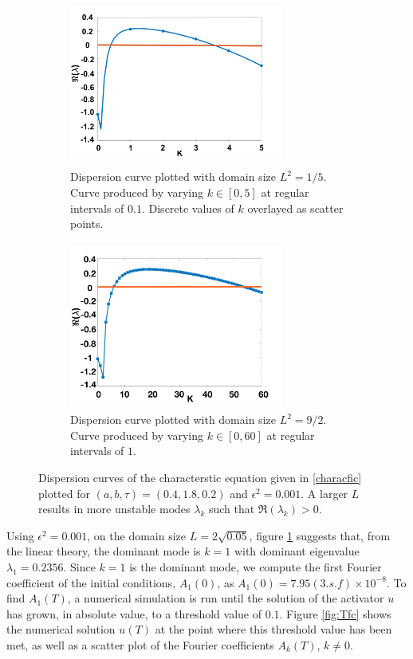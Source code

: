 \begin{figure}[H]
    \centering
    \begin{subfigure}[b]{0.45\textwidth}
        \centering
        \includegraphics[width=7cm,height=5.5cm]{compdisp1.png}
        \caption{Dispersion curve plotted with domain size $L^2=1/5$. Curve produced by varying $k\in[0,5]$ at regular intervals of $0.1$. Discrete values of $k$ overlayed as scatter points. }
        \label{fig:compdisp1}
    \end{subfigure}
    \hfill
    \begin{subfigure}[b]{0.45\textwidth}
        \centering
        \includegraphics[width=7cm,height=5.5cm]{compdisp2.png}
        \caption{Dispersion curve plotted with domain size $L^2=9/2$. Curve produced by varying $k\in[0,60]$ at regular intervals of $1$.}
        \label{fig:compdisp2}
    \end{subfigure}
    \caption{Dispersion curves of the characterstic equation given in \eqref{characfic} plotted for $(a,b,\tau)=(0.4,1.8,0.2)$ and $\epsilon^2=0.001$. A larger $L$ results in more unstable modes $\lambda_k$ such that $\Re(\lambda_k)>0$. }
    \label{fig:compardisp}
\end{figure}
Using $\epsilon^2=0.001$, on the domain size $L=2\sqrt{0.05}$, figure \ref{fig:compdisp1} suggests that, from the linear theory, the dominant mode is $k=1$ with dominant eigenvalue $\lambda_1=0.2356$. Since $k=1$ is the dominant mode, we compute the first Fourier coefficient of the initial conditions, $A_1(0)$, as $A_1(0)=7.95(3.s.f)\times10^{-8}$. To find $A_1(T)$, a numerical simulation is run until the solution of the activator $u$ has grown, in absolute value, to a threshold value of $0.1$. Figure \ref{fig:Tfc} shows the numerical solution $u(T)$ at the point where this threshold value has been met, as well as a scatter plot of the Fourier coefficients $A_k(T)$, $k\neq0$.
